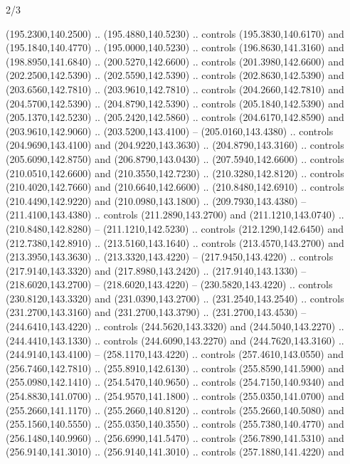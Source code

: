 \begin{flagdescription}{2/3}
\begin{scope}[xshift=0.5\flaglength,yshift=0.5\flagwidth,scale=\flagwidth/259.2]
\begin{scope}[y=0.8pt, x=0.8pt, yscale=-1,shift={(-243,-162)}]
      (195.2300,140.2500) .. (195.4880,140.5230) .. controls (195.3830,140.6170) and
      (195.1840,140.4770) .. (195.0000,140.5230) .. controls (196.8630,141.3160) and
      (198.8950,141.6840) .. (200.5270,142.6600) .. controls (201.3980,142.6600) and
      (202.2500,142.5390) .. (202.5590,142.5390) .. controls (202.8630,142.5390) and
      (203.6560,142.7810) .. (203.9610,142.7810) .. controls (204.2660,142.7810) and
      (204.5700,142.5390) .. (204.8790,142.5390) .. controls (205.1840,142.5390) and
      (205.1370,142.5230) .. (205.2420,142.5860) .. controls (204.6170,142.8590) and
      (203.9610,142.9060) .. (203.5200,143.4100) -- (205.0160,143.4380) .. controls
      (204.9690,143.4100) and (204.9220,143.3630) .. (204.8790,143.3160) .. controls
      (205.6090,142.8750) and (206.8790,143.0430) .. (207.5940,142.6600) .. controls
      (210.0510,142.6600) and (210.3550,142.7230) .. (210.3280,142.8120) .. controls
      (210.4020,142.7660) and (210.6640,142.6600) .. (210.8480,142.6910) .. controls
      (210.4490,142.9220) and (210.0980,143.1800) .. (209.7930,143.4380) --
      (211.4100,143.4380) .. controls (211.2890,143.2700) and (211.1210,143.0740) ..
      (210.8480,142.8280) -- (211.1210,142.5230) .. controls (212.1290,142.6450) and
      (212.7380,142.8910) .. (213.5160,143.1640) .. controls (213.4570,143.2700) and
      (213.3950,143.3630) .. (213.3320,143.4220) -- (217.9450,143.4220) .. controls
      (217.9140,143.3320) and (217.8980,143.2420) .. (217.9140,143.1330) --
      (218.6020,143.2700) -- (218.6020,143.4220) -- (230.5820,143.4220) .. controls
      (230.8120,143.3320) and (231.0390,143.2700) .. (231.2540,143.2540) .. controls
      (231.2700,143.3160) and (231.2700,143.3790) .. (231.2700,143.4530) --
      (244.6410,143.4220) .. controls (244.5620,143.3320) and (244.5040,143.2270) ..
      (244.4410,143.1330) .. controls (244.6090,143.2270) and (244.7620,143.3160) ..
      (244.9140,143.4100) -- (258.1170,143.4220) .. controls (257.4610,143.0550) and
      (256.7460,142.7810) .. (255.8910,142.6130) .. controls (255.8590,141.5900) and
      (255.0980,142.1410) .. (254.5470,140.9650) .. controls (254.7150,140.9340) and
      (254.8830,141.0700) .. (254.9570,141.1800) .. controls (255.0350,141.0700) and
      (255.2660,141.1170) .. (255.2660,140.8120) .. controls (255.2660,140.5080) and
      (255.1560,140.5550) .. (255.0350,140.3550) .. controls (255.7380,140.4770) and
      (256.1480,140.9960) .. (256.6990,141.5470) .. controls (256.7890,141.5310) and
      (256.9140,141.3010) .. (256.9140,141.3010) .. controls (257.1880,141.4220) and

\end{scope}
\end{scope}
\end{flagdescription}
